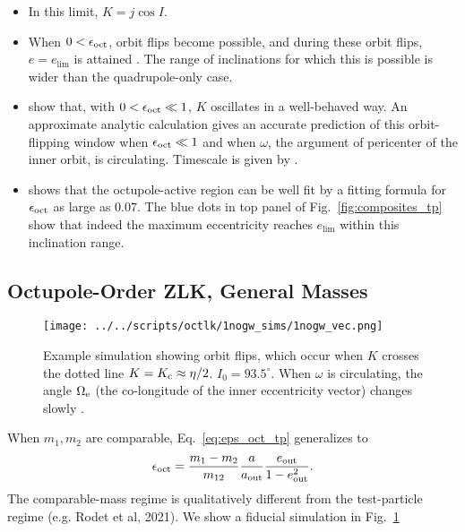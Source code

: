 \documentclass[
        fleqn,
        usenatbib,
    ]{mnras}
\newlength{\colummwidth}
\begin{document}
\begin{itemize}
    \item In this limit, $K = j \cos I$.

    \item When $0 < \epsilon_{\rm oct}$, orbit flips become possible, and
        during these orbit flips, $e = e_{\lim}$ is attained
        \citep{lithwick2011eccentric, LML15}. The range of inclinations for
        which this is possible is wider than the quadrupole-only case.

    \item \citet{katz2011long} show that, with $0 < \epsilon_{\rm oct} \ll 1$,
        $K$ oscillates in a well-behaved way. An approximate analytic
        calculation gives an accurate prediction of this orbit-flipping window
        when $\epsilon_{\rm oct} \ll 1$ and when $\omega$, the argument of
        pericenter of the inner orbit, is circulating. Timescale is given by
        \citet{antognini2015timescales}.

    \item \citep{MLL16} shows that the octupole-active region can be well fit by
        a fitting formula for $\epsilon_{\rm oct}$ as large as $0.07$. The
        blue dots in top panel of Fig.~\ref{fig:composites_tp} show that indeed
        the maximum eccentricity reaches $e_{\lim}$ within this inclination
        range.
\end{itemize}

\subsection{Octupole-Order ZLK, General Masses}

\begin{figure}
    \centering
    \texttt{[image: ../../scripts/octlk/1nogw\_sims/1nogw\_vec.png]}
    \caption{Example simulation showing orbit flips, which occur when $K$
    crosses the dotted line $K = K_{\rm c} \approx \eta / 2$. $I_0 =
    93.5^\circ$. When $\omega$ is circulating, the angle $\Omega_{\rm e}$ (the
    co-longitude of the inner eccentricity vector) changes slowly
    \citep{katz2011long}. }\label{fig:nogw_fiducial}
\end{figure}
When $m_1, m_2$ are comparable, Eq.~\eqref{eq:eps_oct_tp} generalizes to
\begin{equation}
    \epsilon_{\rm oct} = \frac{m_1 - m_2}{m_{12}} \frac{a}{a_{\rm out}}
        \frac{e_{\rm out}}{1 - e_{\rm out}^2}.\label{eq:eps_oct}
\end{equation}
The comparable-mass regime is qualitatively different from the test-particle
regime (e.g. Rodet et al, 2021). We show a fiducial simulation in
Fig.~\ref{fig:nogw_fiducial}
\end{document}
